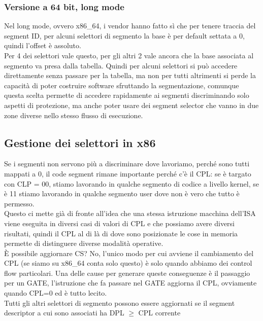 \documentclass[12pt, oneside]{extbook}
\begin{document}
\subsubsection{Versione a 64 bit, long mode}
Nel long mode, ovvero x86\_64, i vendor hanno fatto sì che per tenere traccia del segment ID, per alcuni selettori di segmento la base è per default settata a 0, quindi l'offset è assoluto.\\Per 4 dei selettori vale questo, per gli altri 2 vale ancora che la base associata al segmento va presa dalla tabella. Quindi per alcuni selettori si può accedere direttamente senza passare per la tabella, ma non per tutti altrimenti si perde la capacità di poter costruire software sfruttando la segmentazione, comunque questa scelta permette di accedere rapidamente ai segmenti discriminando solo aspetti di protezione, ma anche poter usare dei segment selector che vanno in due zone diverse nello stesso flusso di esecuzione.
\subsection{Gestione dei selettori in x86}
Se i segmenti non servono più a discriminare dove lavoriamo, perché sono tutti mappati a 0, il code segment rimane importante perché c'è il CPL: se è targato con CLP = 00, stiamo lavorando in qualche segmento di codice a livello kernel, se è 11 stiamo lavorando in qualche segmento user dove non è vero che tutto è permesso.\\Questo ci mette già di fronte all'idea che una stessa istruzione macchina dell'ISA viene eseguita in diversi casi di valori di CPL e che possiamo avere diversi risultati, quindi il CPL al di là di dove sono posizionate le cose in memoria permette di distinguere diverse modalità operative.\\ È possibile aggiornare CS? No, l'unico modo per cui avviene il cambiamento del CPL (se siamo su x86\_64 conta solo questo) è solo quando abbiamo dei control flow particolari. Una delle cause per generare queste conseguenze è il passaggio per un GATE, l'istruzione che fa passare nel GATE aggiorna il CPL, ovviamente quando CPL=0 ed è tutto lecito.\\ Tutti gli altri selettori di segmento possono essere aggiornati se il segment descriptor a cui sono associati ha DPL $\geq$ CPL corrente
\end{document}
